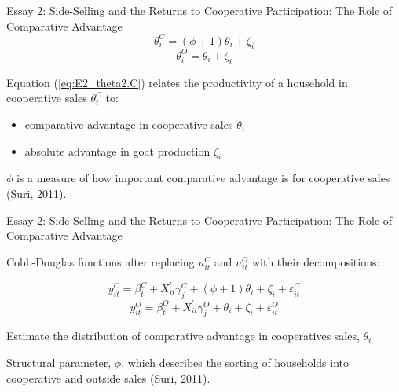\documentclass[aspectratio=169]{beamer}
\newenvironment{wideitemize}{\itemize\addtolength{\itemsep}{10pt}}{\enditemize}
\begin{document}
\begin{frame}{Essay 2: Side-Selling and the Returns to Cooperative Participation: The Role of Comparative Advantage}
    \begin{wideitemize}
    \end{wideitemize}
    \begin{equation} \label{eq:E2_theta2.C}
        \theta^{C}_{i} = (\phi + 1)\theta_{i} + \zeta_i
    \end{equation}
    \begin{equation} \label{eq:E2_theta2.O}
        \theta^{O}_{i} = \theta_{i} + \zeta_i
    \end{equation}
    \begin{wideitemize}
        \item Equation (\ref{eq:E2_theta2.C}) relates the productivity of a household in cooperative sales $\theta^{C}_{i}$ to:
        \begin{itemize}
            \item comparative advantage in cooperative sales $\theta_{i}$
            \item absolute advantage in goat production $\zeta_i$
        \end{itemize} 
        \item $\phi$ is a measure of how important comparative advantage is for cooperative sales (Suri, 2011).
    \end{wideitemize}
\end{frame}

\begin{frame}{Essay 2: Side-Selling and the Returns to Cooperative Participation: The Role of Comparative Advantage}
    \begin{wideitemize}
        \item Cobb-Douglas functions after replacing $u^{C}_{it}$ and $u^{O}_{it}$ with their decompositions:

    \begin{equation} \label{eq:E2_y.C}
    y^{C}_{it} = \beta^{C}_{t} + X^{\prime}_{it}\gamma^{C}_{j} + (\phi + 1)\theta_{i} + \zeta_i + \varepsilon^{C}_{it}
    \end{equation}
    \begin{equation} \label{eq:E2_y.O}
    y^{O}_{it} = \beta^{O}_{t} + X^{\prime}_{it}\gamma^{O}_{j} + \theta_{i} + \zeta_i + \varepsilon^{O}_{it}
    \end{equation}
    
        \item Estimate the distribution of comparative advantage in cooperatives sales, $\theta_{i}$
        \item Structural parameter, $\phi$, which describes the sorting of households into cooperative and outside sales (Suri, 2011).

        

\end{wideitemize}
\end{frame}
\end{document}

